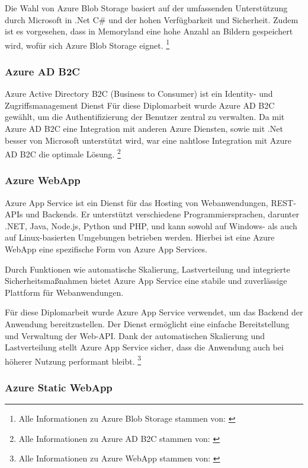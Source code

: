 Die Wahl von Azure Blob Storage basiert auf der umfassenden Unterstützung durch Microsoft 
in .Net C\# und der hohen Verfügbarkeit und Sicherheit. Zudem ist es vorgesehen, dass in Memoryland
eine hohe Anzahl an Bildern gespeichert wird, wofür sich Azure Blob Storage eignet.
\footnote{Alle Informationen zu Azure Blob Storage stammen von: \cite{MicrosoftCorporationu}}

\subsubsection{Azure AD B2C}
\label{subsection:azure_ad_b2c}

Azure Active Directory B2C (Business to Consumer) ist ein Identity- und Zugriffsmanagement Dienst
Für diese Diplomarbeit wurde Azure AD B2C gewählt, um die Authentifizierung der Benutzer 
zentral zu verwalten. Da mit Azure AD B2C eine Integration mit anderen Azure Diensten, sowie mit
.Net besser von Microsoft unterstützt wird, war eine nahtlose Integration mit Azure AD B2C 
die optimale Lösung.
\footnote{Alle Informationen zu Azure AD B2C stammen von: \cite{MicrosoftCorporationw} \cite{MicrosoftCorporationx}}

\subsubsection{Azure WebApp}
\label{subsection:azure_web_app}

Azure App Service ist ein Dienst für das Hosting von Webanwendungen, REST-APIs und 
Backends. Er unterstützt verschiedene Programmiersprachen, darunter .NET, Java, 
Node.js, Python und PHP, und kann sowohl auf Windows- als auch auf Linux-basierten 
Umgebungen betrieben werden. Hierbei ist eine Azure WebApp eine spezifische Form
von Azure App Services.

Durch Funktionen wie automatische Skalierung, Lastverteilung und integrierte 
Sicherheitsmaßnahmen bietet Azure App Service eine stabile und zuverlässige 
Plattform für Webanwendungen.

Für diese Diplomarbeit wurde Azure App Service verwendet, um das Backend der 
Anwendung bereitzustellen. Der Dienst ermöglicht eine einfache Bereitstellung 
und Verwaltung der Web-API. Dank der automatischen Skalierung und Lastverteilung 
stellt Azure App Service sicher, dass die Anwendung auch bei höherer Nutzung 
performant bleibt.
\footnote{Alle Informationen zu Azure WebApp stammen von: \cite{MicrosoftCorporationy}}

\subsubsection{Azure Static WebApp}
\label{subsection:azure_static_web_app}

